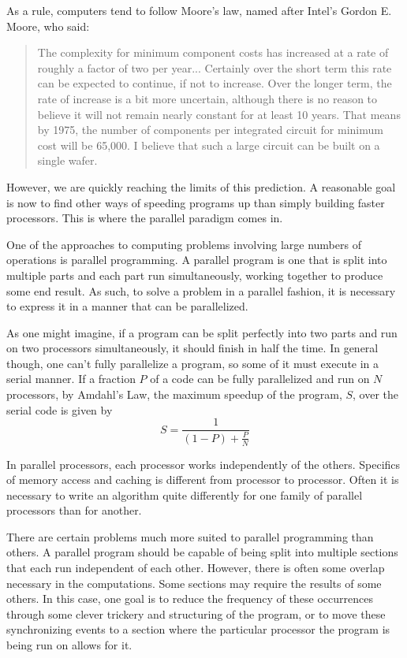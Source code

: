 \documentclass[a4paper,12pt]{report}
\begin{document}
As a rule, computers tend to follow Moore's law, named after Intel's Gordon E. Moore, who said\cite{Moores_Law}:
%
\begin{quotation}
The complexity for minimum component costs has increased at a rate of roughly a factor of two per year...
Certainly over the short term this rate can be expected to continue, if not to increase.
Over the longer term, the rate of increase is a bit more uncertain, although there is no reason to believe it will not remain nearly constant for at least 10 years.
That means by 1975, the number of components per integrated circuit for minimum cost will be 65,000.
I believe that such a large circuit can be built on a single wafer.
\end{quotation}
%
However, we are quickly reaching the limits of this prediction\cite{Moore_Limits}.
A reasonable goal is now to find other ways of speeding programs up than simply building faster processors.
This is where the parallel paradigm comes in.

One of the approaches to computing problems involving large numbers of operations is parallel programming.
A parallel program is one that is split into multiple parts and each part run simultaneously, working together to produce some end result.
As such, to solve a problem in a parallel fashion, it is necessary to express it in a manner that can be parallelized.

As one might imagine, if a program can be split perfectly into two parts and run on two processors simultaneously, it should finish in half the time.
In general though, one can't fully parallelize a program, so some of it must execute in a serial manner.
If a fraction $P$ of a code can be fully parallelized and run on $N$ processors, by Amdahl's Law\cite{Amdahls_Law}, the maximum speedup of the program, $S$, over the serial code is given by
%
\begin{equation}
S = \frac{1}{(1-P) + \frac{P}{N} }
\end{equation}

In parallel processors, each processor works independently of the others.
Specifics of memory access and caching is different from processor to processor.
Often it is necessary to write an algorithm quite differently for one family of parallel processors than for another.

There are certain problems much more suited to parallel programming than others.
A parallel program should be capable of being split into multiple sections that each run independent of each other.
However, there is often some overlap necessary in the computations.
Some sections may require the results of some others.
In this case, one goal is to reduce the frequency of these occurrences through some clever trickery and structuring of the program, or to move these synchronizing events to a section where the particular processor the program is being run on allows for it.
\end{document}

